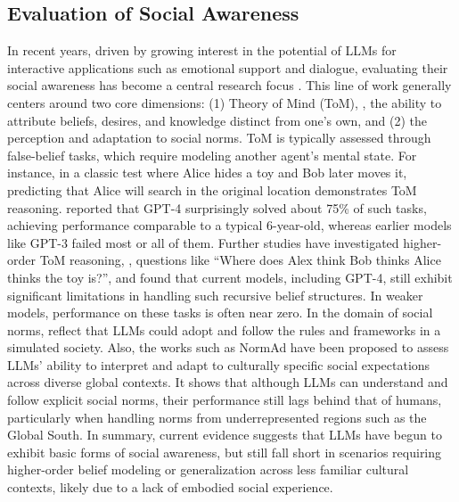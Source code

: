 \subsection{Evaluation of Social Awareness}
In recent years, driven by growing interest in the potential of LLMs for interactive applications such as emotional support and dialogue, evaluating their social awareness has become a central research focus \citep{hagendorff2024we, jiang2025delphi, qiu2024evaluating, voria2024attention, li2024think, DBLP:journals/corr/abs-2305-17066}. This line of work generally centers around two core dimensions: (1) Theory of Mind (ToM), \ie, the ability to attribute beliefs, desires, and knowledge distinct from one’s own, and (2) the perception and adaptation to social norms. ToM is typically assessed through false-belief tasks, which require modeling another agent’s mental state. For instance, in a classic test where Alice hides a toy and Bob later moves it, predicting that Alice will search in the original location demonstrates ToM reasoning.
\citet{Kosinski2024} reported that GPT-4 surprisingly solved about 75\% of such tasks, achieving performance comparable to a typical 6-year-old, whereas earlier models like GPT-3 failed most or all of them.  Further studies \citep{wu2023hi} have investigated higher-order ToM reasoning, \eg,  questions like ``Where does Alex think Bob thinks Alice thinks the toy is?'', and found that current models, including GPT-4, still exhibit significant limitations in handling such recursive belief structures. In weaker models, performance on these tasks is often near zero.
In the domain of social norms, \citet{li2023camel, park2023generative} reflect that LLMs could adopt and follow the rules and frameworks in a simulated society. Also, the works such as NormAd \citep{rao2025normAd} have been proposed to assess LLMs’ ability to interpret and adapt to culturally specific social expectations across diverse global contexts. It shows that although LLMs can understand and follow explicit social norms, their performance still lags behind that of humans,  particularly when handling norms from underrepresented regions such as the Global South. 
In summary, current evidence suggests that LLMs have begun to exhibit basic forms of social awareness, but still fall short in scenarios requiring higher-order belief modeling or generalization across less familiar cultural contexts, likely due to a lack of embodied social experience.


